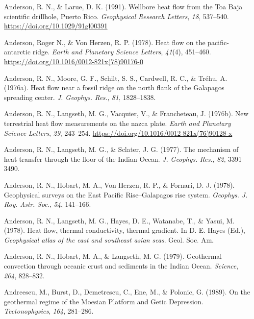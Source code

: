\documentclass[draft,linenumbers]{agujournal2018}
\begin{document}
\leavevmode{}%
Anderson, R. N., \& Larue, D. K. (1991). Wellbore heat flow from the
{Toa Baja} scientific drillhole, {Puerto Rico}. \emph{Geophysical
Research Letters}, \emph{18}, 537--540.
\url{https://doi.org/10.1029/91gl00391}

\leavevmode{}%
Anderson, Roger N., \& Von Herzen, R. P. (1978). Heat flow on the
pacific-antarctic ridge. \emph{Earth and Planetary Science Letters},
\emph{41}(4), 451--460.
\url{https://doi.org/10.1016/0012-821x(78)90176-0}

\leavevmode{}%
Anderson, R. N., Moore, G. F., Schilt, S. S., Cardwell, R. C., \& Tréhu,
A. (1976a). Heat flow near a fossil ridge on the north flank of the
{Galapagos} spreading center. \emph{J. Geophys. Res.}, \emph{81},
1828--1838.

\leavevmode{}%
Anderson, R. N., Langseth, M. G., Vacquier, V., \& Francheteau, J.
(1976b). New terrestrial heat flow measurements on the nazca plate.
\emph{Earth and Planetary Science Letters}, \emph{29}, 243--254.
\url{https://doi.org/10.1016/0012-821x(76)90128-x}

\leavevmode{}%
Anderson, R. N., Langseth, M. G., \& Sclater, J. G. (1977). The
mechanism of heat transfer through the floor of the {Indian Ocean}.
\emph{J. Geophys. Res.}, \emph{82}, 3391--3490.

\leavevmode{}%
Anderson, R. N., Hobart, M. A., Von Herzen, R. P., \& Fornari, D. J.
(1978). Geophysical surveys on the {East Pacific Rise--Galapagos} rise
system. \emph{Geophys. J. Roy. Astr. Soc.}, \emph{54}, 141--166.

\leavevmode{}%
Anderson, R. N., Langseth, M. G., Hayes, D. E., Watanabe, T., \& Yasui,
M. (1978). Heat flow, thermal conductivity, thermal gradient. In D. E.
Hayes (Ed.), \emph{Geophysical atlas of the east and southeast asian
seas}. Geol. Soc. Am.

\leavevmode{}%
Anderson, R. N., Hobart, M. A., \& Langseth, M. G. (1979). Geothermal
convection through oceanic crust and sediments in the {Indian Ocean}.
\emph{Science}, \emph{204}, 828--832.

\leavevmode{}%
Andreescu, M., Burst, D., Demetrescu, C., Ene, M., \& Polonic, G.
(1989). On the geothermal regime of the {Moesian Platform and Getic
Depression}. \emph{Tectonophysics}, \emph{164}, 281--286.
\end{document}
